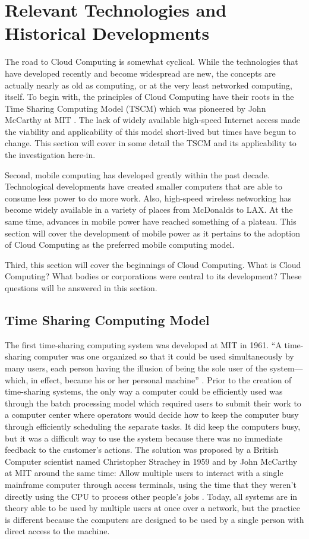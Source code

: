 \section{Relevant Technologies and Historical Developments}

The road to Cloud Computing is somewhat cyclical.  While the technologies that
have developed recently and become widespread are new, the concepts are actually
nearly as old as computing, or at the very least networked computing, itself.
To begin with, the principles of Cloud Computing have their roots in the Time
Sharing Computing Model (TSCM) which was pioneered by John McCarthy at MIT
\citep{levy1994}.  The lack of widely available high-speed Internet access made the
viability and applicability of this model short-lived but times have begun to
change.  This section will cover in some detail the TSCM and its applicability
to the investigation here-in.

Second, mobile computing has developed greatly within the past decade.
Technological developments have created smaller computers that are able to
consume less power to do more work.  Also, high-speed wireless networking has
become widely available in a variety of places from McDonalds to LAX.  At the
same time, advances in mobile power have reached something of a plateau.  This
section will cover the development of mobile power as it pertains to the
adoption of Cloud Computing as the preferred mobile computing model.

Third, this section will cover the beginnings of Cloud Computing.  What is Cloud
Computing?  What bodies or corporations were central to its development?  These
questions will be answered in this section.

\subsection{Time Sharing Computing Model}

The first time-sharing computing system was developed at MIT in 1961.  ``A
time-sharing computer was one organized so that it could be used simultaneously
by many users, each person having the illusion of being the sole user of the
system---which, in effect, became his or her personal machine''
\citep{kelly2004}.  Prior to the creation of time-sharing systems, the only
way a computer could be efficiently used was through the batch processing model
which required users to submit their work to a computer center where operators
would decide how to keep the computer busy through efficiently scheduling the
separate tasks.  It did keep the computers busy, but it was a difficult way to
use the system because there was no immediate feedback to the customer's
actions.  The solution was proposed by a British Computer scientist named
Christopher Strachey in 1959 and by John McCarthy at MIT around the same time:
Allow multiple users to interact with a single mainframe computer through access
terminals, using the time that they weren't directly using the CPU to process
other people's jobs \citep{kelly2004}.  Today, all systems are in theory able
to be used by multiple users at once over a network, but the practice is
different because the computers are designed to be used by a single person with
direct access to the machine.

